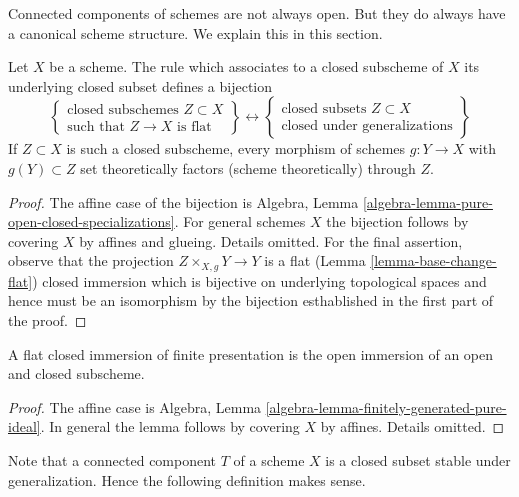 \noindent
Connected components of schemes are not always open. But they do always
have a canonical scheme structure. We explain this in this section.

\begin{lemma}
\label{lemma-characterize-flat-closed-immersions}
Let $X$ be a scheme. The rule which associates to a closed subscheme
of $X$ its underlying closed subset defines a bijection
$$
\left\{
\begin{matrix}
\text{closed subschemes }Z \subset X \\
\text{such that }Z \to X\text{ is flat}
\end{matrix}
\right\}
\leftrightarrow
\left\{
\begin{matrix}
\text{closed subsets }Z \subset X \\
\text{closed under generalizations}
\end{matrix}
\right\}
$$
If $Z \subset X$ is such a closed subscheme, every morphism of schemes
$g : Y \to X$ with $g(Y) \subset Z$ set theoretically factors (scheme
theoretically) through $Z$.
\end{lemma}

\begin{proof}
The affine case of the bijection is
Algebra, Lemma \ref{algebra-lemma-pure-open-closed-specializations}.
For general schemes $X$ the bijection follows by covering $X$ by affines
and glueing. Details omitted. For the final assertion, observe that the
projection $Z \times_{X, g} Y \to Y$ is a flat
(Lemma \ref{lemma-base-change-flat}) closed immersion which
is bijective on underlying topological spaces and hence must be
an isomorphism by the bijection esthablished in the first part of the proof.
\end{proof}

\begin{lemma}
\label{lemma-flat-closed-immersions-finite-presentation}
A flat closed immersion of finite presentation
is the open immersion of an open and closed subscheme.
\end{lemma}

\begin{proof}
The affine case is
Algebra, Lemma \ref{algebra-lemma-finitely-generated-pure-ideal}.
In general the lemma follows by covering $X$ by affines.
Details omitted.
\end{proof}

\noindent
Note that a connected component $T$ of a scheme $X$ is a closed
subset stable under generalization. Hence the following definition
makes sense.

